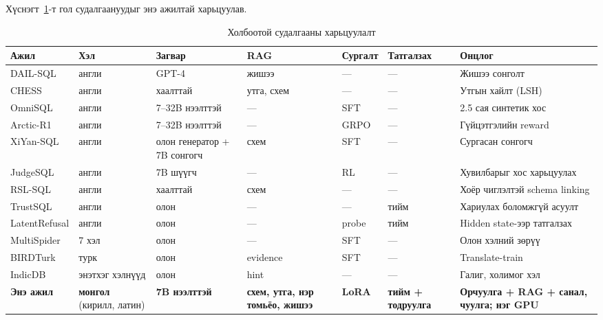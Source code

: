 Хүснэгт~\ref{tab:related-compare}-т гол судалгаануудыг энэ ажилтай харьцуулав.

\begin{table}[H]
\centering\scriptsize
\caption{Холбоотой судалгааны харьцуулалт}
\label{tab:related-compare}
\begin{tabularx}{\textwidth}{p{2.6cm}p{1.6cm}p{1.6cm}p{1.2cm}p{1.2cm}p{1.3cm}X}
\toprule
Ажил & Хэл & Загвар & RAG & Сургалт & Татгалзах & Онцлог \\
\midrule
DAIL-SQL \cite{gao_2024_dail_sql} & англи & GPT-4 & жишээ & --- & --- & Жишээ сонголт \\
CHESS \cite{talaei_2024_chess} & англи & хаалттай & утга, схем & --- & --- & Утгын хайлт (LSH) \\
OmniSQL \cite{li_2025_omnisql} & англи & 7--32B нээлттэй & --- & SFT & --- & 2.5 сая синтетик хос \\
Arctic-R1 \cite{yao_2025_arctic_text2sql_r1} & англи & 7--32B нээлттэй & --- & GRPO & --- & Гүйцэтгэлийн reward \\
XiYan-SQL \cite{liu_2025_xiyan_sql} & англи & олон генератор + 7B сонгогч & схем & SFT & --- & Сургасан сонгогч \\
JudgeSQL \cite{bai_2025_judgesql} & англи & 7B шүүгч & --- & RL & --- & Хувилбарыг хос харьцуулах \\
RSL-SQL \cite{cao_2024_rsl_sql} & англи & хаалттай & схем & --- & --- & Хоёр чиглэлтэй schema linking \\
TrustSQL \cite{lee_2024_trustsql} & англи & олон & --- & --- & тийм & Хариулах боломжгүй асуулт \\
LatentRefusal \cite{ren_2026_latentrefusal} & англи & олон & --- & probe & тийм & Hidden state-ээр татгалзах \\
MultiSpider \cite{dou_2023_multispider} & 7 хэл & олон & --- & SFT & --- & Олон хэлний зөрүү \\
BIRDTurk \cite{aktas_2026_birdturk} & турк & олон & evidence & SFT & --- & Translate-train \\
IndicDB \cite{dawar_2026_indicdb} & энэтхэг хэлнүүд & олон & hint & --- & --- & Галиг, холимог хэл \\
\textbf{Энэ ажил} & \textbf{монгол} (кирилл, латин) & \textbf{7B нээлттэй} & \textbf{схем, утга, нэр томьёо, жишээ} &
  \textbf{LoRA} & \textbf{тийм + тодруулга} & \textbf{Орчуулга + RAG + санал, чуулга; нэг GPU} \\
\bottomrule
\end{tabularx}
\end{table}

